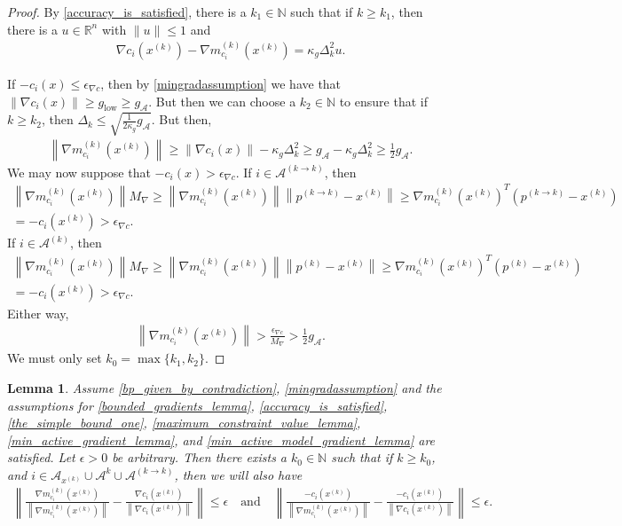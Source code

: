 \documentclass{article}
\newtheorem{lemma}[theorem]{Lemma}
\theoremstyle{case}
\newcommand{\dk}{\Delta_k}
\newcommand{\gmcik}{{\nabla m_{c_i}^{(k)}\left(\xk\right)}}
\newcommand{\maxgrad}{{M_{\nabla}}}
\newcommand{\minactivegrad}{{ g_{\mathcal A} }}
\newcommand{\mingradepsilon}{{\epsilon_{\nabla c}}}
\newcommand{\mingrad}{{ g_{\text{low}} }}
\newcommand{\naturals}{\mathbb N}
\newcommand{\Rn}{\mathbb R^n}
\newcommand{\xk}{{x^{(k)}}}
\begin{document}
\begin{proof}
By \cref{accuracy_is_satisfied}, there is a $k_1 \in \naturals $ such that if $k \ge k_1$, then there is a $u \in \Rn$ with $\|u\| \le 1$ and
\begin{align*}
\nabla c_i(\xk) - \gmcik = \kappa_g \dk^2 u.
\end{align*}

If $-c_i(x) \le \mingradepsilon$, then by \cref{mingradassumption} we have that $\|\nabla c_i(x)\| \ge \mingrad \ge \minactivegrad$.
But then we can choose a $k_2 \in \naturals$ to ensure that if $k \ge k_2$, then $\dk \le \sqrt{\frac 1 {2\kappa_g} \minactivegrad}$.
But then,
\begin{align*}
\left\|\gmcik\right\| \ge \|\nabla c_i(x)\| - \kappa_g \dk^2 \ge \minactivegrad - \kappa_g \dk^2 \ge \frac 1 2 \minactivegrad.
\end{align*}
We may now suppose that $-c_i(x) > \mingradepsilon$.
If $i \in \mathcal A^{(k\to k)}$, then
\begin{align*}
\left\|\gmcik\right\| \maxgrad \ge \left\|\gmcik\right\|\left\|p^{(k\to k)} - \xk\right\|
\ge \gmcik^T\left(p^{(k\to k)} - \xk\right) \\
= -c_i(\xk) > \mingradepsilon.
\end{align*}
If $i \in \mathcal A^{(k)}$, then
\begin{align*}
\left\|\gmcik\right\| \maxgrad \ge \left\|\gmcik\right\|\left\|p^{(k)} - \xk\right\|
\ge \gmcik^T\left(p^{(k)} - \xk\right) \\
= -c_i(\xk) > \mingradepsilon.
\end{align*}
Either way,
\begin{align*}
\left\|\gmcik\right\| > \frac {\mingradepsilon} {\maxgrad} > \frac 1 2 \minactivegrad.
\end{align*}
We must only set $k_0 = \max\{k_1, k_2\}$.
\end{proof}



\begin{lemma}
\label{bp_models_are_close_to_true_values}
Assume \cref{bp_given_by_contradiction}, \cref{mingradassumption} and the assumptions for
\cref{bounded_gradients_lemma},
\cref{accuracy_is_satisfied},
\cref{the_simple_bound_one},
\cref{maximum_constraint_value_lemma},
\cref{min_active_gradient_lemma},
and \cref{min_active_model_gradient_lemma}
are satisfied.
Let $\epsilon > 0$ be arbitrary.
Then there exists a $k_0 \in \naturals$ such that if $k \ge k_0$, and $i \in \mathcal A_{\xk} \cup \mathcal A^{k} \cup \mathcal A^{(k \to k)} $,
then we will also have%
\begin{align*}
\left\|\frac{\gmcik}{\left\|\gmcik\right\|} - \frac{\nabla c_i\left(\xk\right)}{\left\|\nabla c_i\left(\xk \right)\right\|} \right\| \le \epsilon \quad \textrm{and} \quad
\left\|\frac{-c_i\left(\xk \right)}{\left\|\gmcik\right\|} - \frac{-c_i\left(\xk \right)}{\left\|\nabla c_i\left(\xk \right)\right\|} \right\| \le \epsilon.
\end{align*}
\end{lemma}
\end{document}
